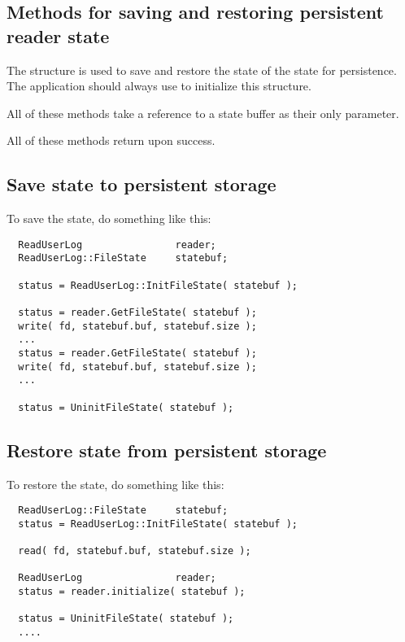 \subsection{Methods for saving and restoring persistent reader state}

The  structure is used to save and
restore the state of the  state for persistence.  The
application should always use  to initialize this
structure.

All of these methods take a reference to a state buffer
as their only parameter.

All of these methods return  upon success.

\subsection{Save state to persistent storage}
To save the state, do something like this:
\footnotesize
\begin{verbatim}
  ReadUserLog                reader;
  ReadUserLog::FileState     statebuf;

  status = ReadUserLog::InitFileState( statebuf );

  status = reader.GetFileState( statebuf );
  write( fd, statebuf.buf, statebuf.size );
  ...
  status = reader.GetFileState( statebuf );
  write( fd, statebuf.buf, statebuf.size );
  ...

  status = UninitFileState( statebuf );
\end{verbatim}
\normalsize

\subsection{Restore state from persistent storage}
To restore the state, do something like this:
\footnotesize
\begin{verbatim}
  ReadUserLog::FileState     statebuf;
  status = ReadUserLog::InitFileState( statebuf );

  read( fd, statebuf.buf, statebuf.size );

  ReadUserLog                reader;
  status = reader.initialize( statebuf );

  status = UninitFileState( statebuf );
  ....
\end{verbatim}
\normalsize

